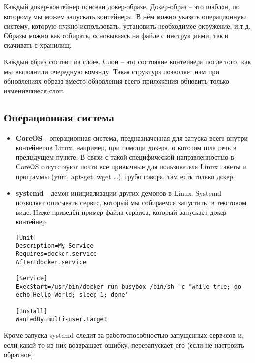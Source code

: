 	Каждый докер-контейнер основан докер-образе. Докер-образ -- это шаблон, по которому мы можем запускать контейнеры. В нём можно указать операционную систему, которую нужно использовать, установить необходимое окружение, и.т.д. Образы можно как собирать, основываясь на файле с инструкциями, так и скачивать с хранилищ.
	
	Каждый образ состоит из слоёв. Слой -- это состояние контейнера после того, как мы выполнили очередную команду. Такая структура позволяет нам при обновлениях образа вместо обновления всего приложения обновить только изменившиеся слои.
\subsection{Операционная система}
\begin{itemize}

	\item {\bf CoreOS} - операционная система, предназначенная для запуска всего внутри контейнеров Linux, например, при помощи докера, о котором шла речь в предыдущем пункте. В связи с такой специфической направленностью в CoreOS отсутствуют почти все привычные для пользователя Linux пакеты и программы (yum, apt-get, wget \dots), грубо говоря, там есть только докер.
	
	\item {\bf systemd} - демон инициализации других демонов в Linux. Systemd позволяет описывать сервис, который мы собираемся запустить, в текстовом виде. Ниже приведён пример файла сервиса, который запускает докер контейнер.
\begin{lstlisting}
[Unit]
Description=My Service
Requires=docker.service
After=docker.service

[Service]	
ExecStart=/usr/bin/docker run busybox /bin/sh -c "while true; do echo Hello World; sleep 1; done"

[Install]
WantedBy=multi-user.target
\end{lstlisting}
\end{itemize}
	Кроме запуска systemd следит за работоспособностью запущенных сервисов и, если какой-то из них возвращает ошибку, перезапускает его (если не настроить обратное).
